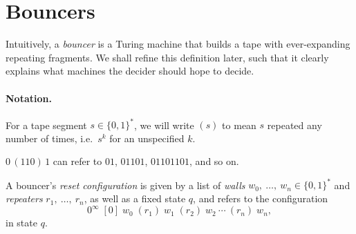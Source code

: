 
\section{Bouncers}\label{sec:bouncers}

Intuitively, a \emph{bouncer} is a Turing machine that builds a tape with
ever-expanding repeating fragments. We shall refine this definition later,
such that it clearly explains what machines the decider should hope to decide.

\paragraph{Notation.} For a tape segment $s \in \{0, 1\}^*$, we will
write $(s)$ to mean $s$ repeated any number of times, i.e.~$s^k$ for
an unspecified $k$. 

\begin{example}
    $0\,(110)\,1$ can refer to $01$, $01101$, $01101101$, and so on.
\end{example}

\begin{definition}
    A bouncer's \emph{reset configuration} is given by
    a list of \emph{walls} $w_0,\ \ldots,\ w_n \in \{0, 1\}^*$
    and \emph{repeaters} $r_1,\ \ldots,\ r_n$, as well as a fixed state $q$,
    and refers to the configuration
    \begin{equation}
        0^\infty\; [0]\; w_0\; (r_1)\; w_1\; (r_2)\; w_2\: \cdots\: (r_n)\; w_n,
    \end{equation}
    in state $q$.
\end{definition}

